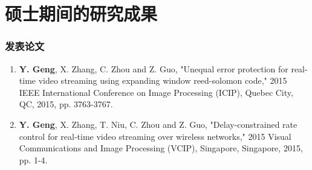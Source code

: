 %
%
%
%


%
%
\chapter*{硕士期间的研究成果}
{}
\renewcommand\labelenumi{[\theenumi]}

\subsection*{发表论文}
\newitemsep
{\typebib
\begin{enumerate}
  \item \textbf{Y. Geng}, X. Zhang, C. Zhou and Z. Guo, "Unequal error protection for real-time video streaming using expanding window reed-solomon code," 2015 IEEE International Conference on Image Processing (ICIP), Quebec City, QC, 2015, pp. 3763-3767.
  \item \textbf{Y. Geng}, X. Zhang, T. Niu, C. Zhou and Z. Guo, "Delay-constrained rate control for real-time video streaming over wireless networks," 2015 Visual Communications and Image Processing (VCIP), Singapore, Singapore, 2015, pp. 1-4.
\end{enumerate}
}

